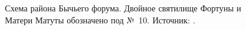 \begin{appendices}
\begin{figure}[ht!]
\caption{Схема района Бычьего форума. Двойное святилище Фортуны и Матери Матуты обозначено под №~10. \footnotesize{Источник: \cite[P. 163]{Richardson1992}}. }
\label{pic:ForiBoariSchema}
\end{figure}


\end{appendices}
